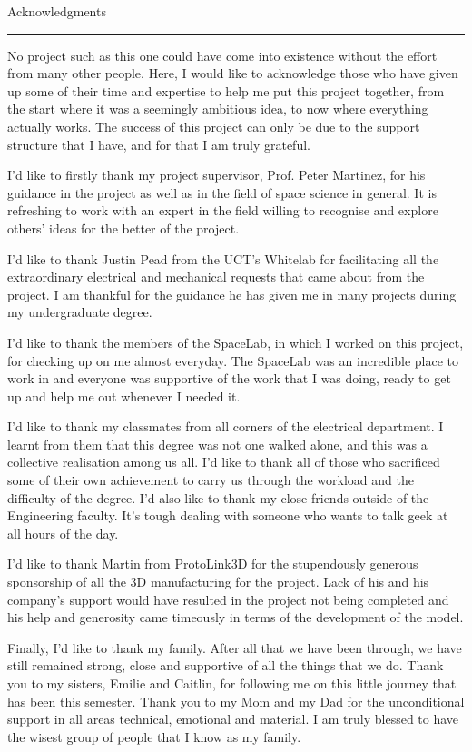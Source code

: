 \pagestyle{plain}

{\Large Acknowledgments}\\
\hrule

No project such as this one could have come into existence without the effort from many other people. Here, I would like to acknowledge those who have given up some of their time and expertise to help me put this project together, from the start where it was a seemingly ambitious idea, to now where everything actually works. The success of this project can only be due to the support structure that I have, and for that I am truly grateful.

I'd like to firstly thank my project supervisor, Prof. Peter Martinez, for his guidance in the project as well as in the field of space science in general. It is refreshing to work with an expert in the field willing to recognise and explore others' ideas for the better of the project.

I'd like to thank Justin Pead from the UCT's Whitelab for facilitating all the extraordinary electrical and mechanical requests that came about from the project. I am thankful for the guidance he has given me in many projects during my undergraduate degree.

I'd like to thank the members of the SpaceLab, in which I worked on this project, for checking up on me almost everyday. The SpaceLab was an incredible place to work in and everyone was supportive of the work that I was doing, ready to get up and help me out whenever I needed it.

I'd like to thank my classmates from all corners of the electrical department. I learnt from them that this degree was not one walked alone, and this was a collective realisation among us all. I'd like to thank all of those who sacrificed some of their own achievement to carry us through the workload and the difficulty of the degree. I'd also like to thank my close friends outside of the Engineering faculty. It's tough dealing with someone who wants to talk geek at all hours of the day.

I'd like to thank Martin from ProtoLink3D for the stupendously generous sponsorship of all the 3D manufacturing for the project. Lack of his and his company's support would have resulted in the project not being completed and his help and generosity came timeously in terms of the development of the model.

Finally, I'd like to thank my family. After all that we have been through, we have still remained strong, close and supportive of all the things that we do. Thank you to my sisters, Emilie and Caitlin, for following me on this little journey that has been this semester. Thank you to my Mom and my Dad for the unconditional support in all areas technical, emotional and material. I am truly blessed to have the wisest group of people that I know as my family.